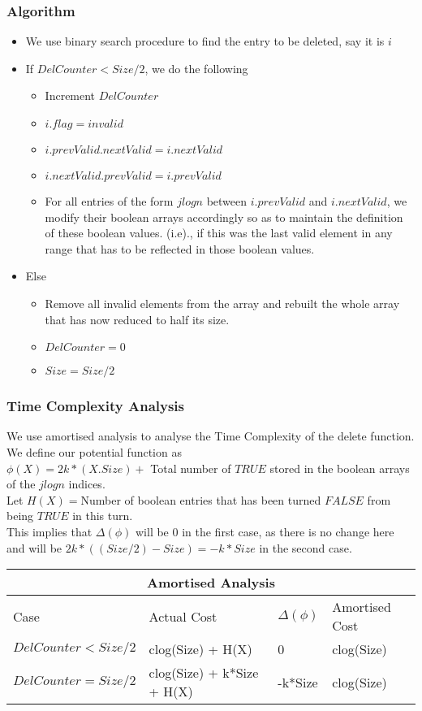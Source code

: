 \documentclass{article}
\begin{document}
\subsubsection{Algorithm}
\begin{itemize}
\item We use binary search procedure to find the entry to be deleted, say it is $i$ 
\item If $DelCounter < Size/2$, we do the following
\begin{itemize}
\item Increment $DelCounter$
\item $i.flag = invalid$
\item $i.prevValid.nextValid = i.nextValid$
\item $i.nextValid.prevValid = i.prevValid$
\item For all entries of the form $jlogn$ between $i.prevValid$ and $i.nextValid$, we modify their boolean arrays accordingly so as to maintain the definition of these boolean values. (i.e)., if this was the last valid element in any range that has to be reflected in those boolean values.
\end{itemize}
\item Else
\begin{itemize}
\item Remove all invalid elements from the array and rebuilt the whole array that has now reduced to half its size.
\item $DelCounter = 0$
\item $Size = Size/2$ 
\end{itemize}
\end{itemize}
\subsubsection{Time Complexity Analysis}
We use amortised analysis to analyse the Time Complexity of the delete function. We define our potential function as \\
$\phi(X) = 2k * (X.Size) + $ Total number of $TRUE$ stored in the boolean arrays of the $jlogn$ indices. \\
Let $H(X) = $Number of boolean entries that has been turned $FALSE$ from being $TRUE$ in this turn.  \\
This implies that $\Delta(\phi)$ will be $0$ in the first case, as there is no change here and will be $2k * ((Size/2)-Size) = -k*Size$ in the second case. \\

\begin{tabular}{ |p{4cm}|p{4cm}|p{2cm}|p{3cm}|  }
 \hline
 \multicolumn{4}{|c|}{Amortised Analysis} \\
 \hline
 Case & Actual Cost& $\Delta(\phi)$ & Amortised Cost\\
 \hline
 $DelCounter < Size/2$ & clog(Size) + H(X)          & 0        & clog(Size)   \\
 $DelCounter = Size/2$ & clog(Size) + k*Size + H(X) & -k*Size  & clog(Size)  \\
 \hline
\end{tabular} \\
\end{document}

